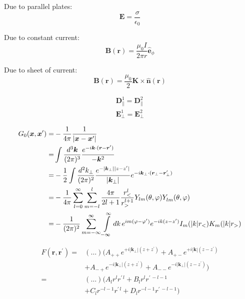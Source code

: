 \documentclass[a4paper, twocolumn]{article}
\renewcommand{\vec}[1]{\boldsymbol{#1}}
\begin{document}
Due to parallel plates:
\begin{equation*}
    \vec{E} = \frac{\sigma}{\epsilon_{0}}
\end{equation*}

Due to constant current:
\begin{equation*}
    \vec{B}(\vec{r}) = \frac{\mu_{0} I}{2 \pi r} \hat{\vec{e}}_{\phi}
\end{equation*}

Due to sheet of current:
\begin{equation*}
    \vec{B}(\vec{r}) = \frac{\mu_{0}}{2} \vec{K} \times \hat{\vec{n}}(\vec{r})
\end{equation*}

\begin{align*}
    \vec{D}_{\parallel}^{1} = \vec{D}_{\parallel}^{2} \\
    \vec{E}_{\perp}^{1} = \vec{E}_{\perp}^{2}
\end{align*}


\begin{align*}
    G_0(\vec{x}, \vec{x}^{\prime}) =& - \frac{1}{4 \pi} \frac{1}{|\vec{x} - \vec{x}^{\prime}|} \\
                                   =& \int \frac{d^{3} \vec{k}}{(2 \pi)^{3}} \frac{ e^{-i \vec{k} \cdot (\vec{r} - \vec{r}^{\prime})}}{-\vec{k}^{2}} \\
                                   =& -\frac{1}{2} \int \frac{d^{2} k_{\perp}}{(2 \pi)^{2}} \frac{e^{- |\vec{k}_{\perp}| |z - z^{\prime}|}}{|\vec{k}_{\perp}|} e^{-i \vec{k}_{\perp} \cdot (\vec{r}_{\perp} - \vec{r}^{\prime}_{\perp})} \\
                                   =& - \frac{1}{4 \pi} \sum\limits_{l=0}^{\infty} \sum\limits_{m=-l}^{l} \frac{4 \pi}{2l+1} \frac{r_{<}^{l}}{r_{>}^{l+1}} Y_{lm}(\theta, \varphi) Y_{lm}^{\*}(\theta, \varphi) \\
                                   =& -\frac{1}{(2 \pi)^{2}} \sum\limits_{m=-\infty}^{\infty} \int\limits_{-\infty}^{\infty} dk \, e^{im (\varphi - \varphi^{\prime})} e^{-ik(z-z^{\prime})} I_{m}(|k| r_{<}) K_{m}(|k| r_{>})
\end{align*}

\begin{align*}
    F(\vec{r}, \vec{r}^{\prime})
    =& (\dots) (A_{++} e^{+i |\vec{k}_{\perp}| ( z + z^{\prime})} + A_{+-} e^{+i |\vec{k}| ( z - z^{\prime})} \\
     &+ A_{-+} e^{-i |\vec{k}_{\perp}| ( z + z^{\prime})} + A_{--} e^{-i |\vec{k}_{\perp}| ( z - z^{\prime})}) \\
    =& (\dots) (A_{l} r^{l} r^{\prime \, l} + B_{l} r^{l} r^{\prime \, -l-1} \\
     &+ C_{l} r^{-l-1} r^{\prime \, l} + D_{l} r^{-l-1} r^{\prime \, -l-1} ) \\
\end{align*}
\end{document}
